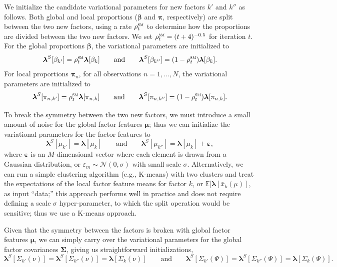 \documentclass[twoside,11pt]{article}
\newcommand{\E}{\mathbb{E}}
\begin{document}
We initialize the candidate variational parameters for new factors $k'$ and $k''$ as follows. Both global and local proportions ($\boldsymbol{\beta}$ and $\boldsymbol{\pi}$, respectively) are split between the two new factors, using a rate $\rho^{\textsc{sm}}_t$ to determine how the proportions are divided between the two new factors. We set $\rho^{\textsc{sm}}_t= (t + 4) ^ {-0.5}$ for iteration $t$.  For the global proportions $\boldsymbol{\beta}$, the variational parameters are initialized to
\begin{equation}
     \boldsymbol{\lambda}^S[{\beta}_{k'}] = \rho^{\textsc{sm}}_t  \boldsymbol{\lambda}[{\beta}_{k}]
        \qquad \mbox{and} \qquad
    \boldsymbol{\lambda}^S[{\beta}_{k''}] = (1 - \rho^{\textsc{sm}}_t) \boldsymbol{\lambda}[{\beta}_{k}].
    \label{eq:S1}
\end{equation}
For local proportions $\boldsymbol{\pi}_n$, for all observations $n=1,\dots,N$, the variational parameters are initialized to
\begin{equation}
    \boldsymbol{\lambda}^S[\pi_{n,k'}] = \rho^{\textsc{sm}}_t  \boldsymbol{\lambda}[\pi_{n,k}]
        \qquad \mbox{and} \qquad
    \boldsymbol{\lambda}^S[\pi_{n,k''}] = (1 - \rho^{\textsc{sm}}_t) \boldsymbol{\lambda}[{\pi}_{n,k}].
    \label{eq:S2}
\end{equation}

To break the symmetry between the two new factors, we must introduce a small amount of noise for the global factor features $\boldsymbol{\mu}$; thus we can initialize the variational parameters for the factor features to
\begin{equation}
    \boldsymbol{\lambda}^S[\mu_{k'}] = \boldsymbol{\lambda}[\mu_{k}]
        \qquad \mbox{and} \qquad
   \boldsymbol{\lambda}^S[\mu_{k''}] = \boldsymbol{\lambda}[\mu_{k}] + \boldsymbol{\varepsilon},
   \label{eq:S3}
\end{equation}
where $\boldsymbol{\varepsilon}$ is an $M$-dimensional vector where each element is drawn from a Gaussian distribution, or $\varepsilon_m\sim\mathcal{N}(0,\sigma)$ with small scale $\sigma$.  Alternatively, we can run a simple clustering algorithm (e.g., K-means) with two clusters and treat the expectations of the local factor feature means for factor $k$, or $\E[\boldsymbol{\lambda}[\bar{x}_k(\mu)]$, as input ``data;'' this approach performs well in practice and does not require defining a scale $\sigma$ hyper-parameter, to which the split operation would be sensitive; thus we use a K-means approach.
  
Given that the symmetry between the factors is broken with global factor features $\boldsymbol{\mu}$, we can simply carry over the variational parameters for the global factor covariances $\boldsymbol{\Sigma}$, giving us straightforward initializations,
\begin{equation}
    \boldsymbol{\lambda}^S[\Sigma_{k'}(\nu)] = \boldsymbol{\lambda}^S[\Sigma_{k''}(\nu)] =
    \boldsymbol{\lambda}[\Sigma_{k}(\nu)]
        \qquad \mbox{and} \qquad
    \boldsymbol{\lambda}^S[\Sigma_{k'}(\Psi)] = \boldsymbol{\lambda}^S[\Sigma_{k''}(\Psi)] =
    \boldsymbol{\lambda}[\Sigma_{k}(\Psi)].
    \label{eq:S4}
\end{equation}
\end{document}
